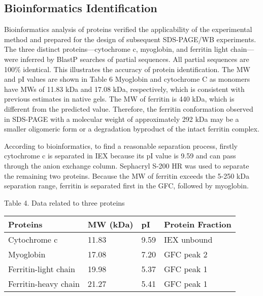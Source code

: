 \documentclass[a4paper,10pt]{article}
\begin{document}
\begin{multicols}{2}
\subsection{Bioinformatics Identification}
Bioinformatics analysis of proteins verified the applicability of the experimental method and prepared for the design of subsequent SDS-PAGE/WB experiments. The three distinct proteins—cytochrome c, myoglobin, and ferritin light chain—were inferred by BlastP searches of partial sequences. All partial sequences are 100\% identical. This illustrates the accuracy of protein identification. The MW and pI values are shown in Table 6 Myoglobin and cytochrome C as monomers have MWs of 11.83 kDa and 17.08 kDa, respectively, which is consistent with previous estimates in native gels. The MW of ferritin is 440 kDa, which is different from the predicted value. Therefore, the ferritin conformation observed in SDS-PAGE with a molecular weight of approximately 292 kDa may be a smaller oligomeric form or a degradation byproduct of the intact ferritin complex.

According to bioinformatics, to find a reasonable separation process, firstly cytochrome c is separated in IEX because its pI value is 9.59 and can pass through the anion exchange column. Sephacryl S-200 HR was used to separate the remaining two proteins. Because the MW of ferritin exceeds the 5-250 kDa separation range, ferritin is separated first in the GFC, followed by myoglobin.


\begin{center}
{Table 4. Data related to three proteins}
\vspace{0pt}
\begin{table}[H]
\setlength{\tabcolsep}{5pt}
\footnotesize
\begin{tabular}{llll}
\toprule [1pt]
Proteins&MW (kDa)& pI & Protein Fraction\\
\hline
Cytochrome c & 11.83 & 9.59 & IEX unbound\\
Myoglobin & 17.08 & 7.20 & GFC peak 2\\
Ferritin-light chain & 19.98 & 5.37 & GFC peak 1\\
Ferritin-heavy chain & 21.27 & 5.41 & GFC peak 1\\
\bottomrule [1pt]
\end{tabular}
\end{table}
\end{center}



\end{multicols}
\end{document}
